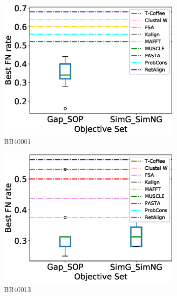 \begin{figure}[!htbp]
\begin{adjustwidth}{-1.5cm}{-1cm}
		\begin{subfigure}{0.22\textwidth}
			\includegraphics[width=\columnwidth]{Figure/summary/precomputedInit/Balibase/BB40001_objset_fnrate_rank}
			\caption{BB40001}
		\end{subfigure}	
		\begin{subfigure}{0.22\textwidth}
			\includegraphics[width=\columnwidth]{Figure/summary/precomputedInit/Balibase/BB40013_objset_fnrate_rank}
			\caption{BB40013}
		\end{subfigure}
		\begin{subfigure}{0.22\textwidth}

\end{subfigure}
\end{adjustwidth}
\end{figure}
